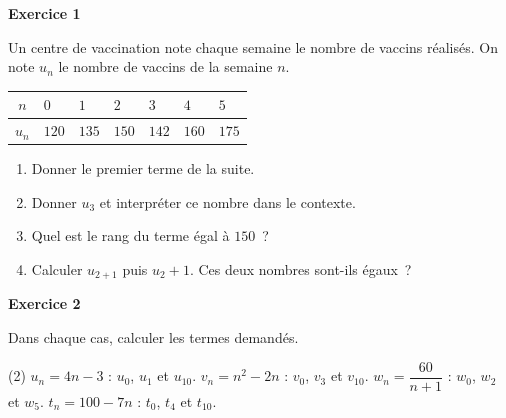 \documentclass[a4paper,11pt]{article}
\newenvironment{exercice}[1]{%
  \Needspace{6\baselineskip}\par\bigskip\noindent\textbf{Exercice #1}\par\smallskip\noindent\ignorespaces
}{%
  \par
}
\begin{document}
\pagestyle{fancy}

\fancyhf{} %
\fancyhead[L]{ {\Niveau}}
\fancyhead[C]{ {\Chapitre}}
\fancyhead[R]{ {\Document}}
\fancyfoot[R]{{\thepage\  / \pageref{LastPage}}}

\begin{exercice}{1}
Un centre de vaccination note chaque semaine le nombre de vaccins réalisés. On note $u_n$ le nombre de vaccins de la semaine $n$.

\renewcommand{\arraystretch}{1.4}
\begin{center}
\begin{tabular}{|c|*{6}{C{1.1cm}|}}
  \hline
  $n$ & $0$ & $1$ & $2$ & $3$ & $4$ & $5$ \\
  \hline
  $u_n$ & $120$ & $135$ & $150$ & $142$ & $160$ & $175$ \\
  \hline
\end{tabular}
\end{center}
\begin{enumerate}[label=\arabic*.]
\item Donner le premier terme de la suite.
\item Donner $u_3$ et interpréter ce nombre dans le contexte.
\item Quel est le rang du terme égal à $150$~?
\item Calculer $u_{2+1}$ puis $u_2 + 1$. Ces deux nombres sont-ils égaux~?
\end{enumerate}
\end{exercice}

\begin{exercice}{2}
Dans chaque cas, calculer les termes demandés.
\begin{tasks}(2)
\task $u_n = 4n - 3$ : $u_0$, $u_1$ et $u_{10}$.
\task $v_n = n^2 - 2n$ : $v_0$, $v_3$ et $v_{10}$.
\task $w_n = \dfrac{60}{n + 1}$ : $w_0$, $w_2$ et $w_5$.
\task $t_n = 100 - 7n$ : $t_0$, $t_4$ et $t_{10}$.
\end{tasks}
\end{exercice}
\end{document}
